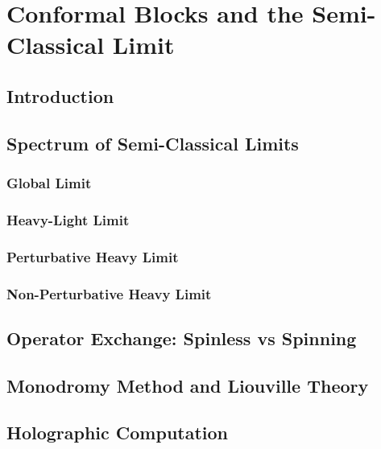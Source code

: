   \chapter{Conformal Blocks and the Semi-Classical Limit}

  \section{Introduction}
  \section{Spectrum of Semi-Classical Limits}
  \subsection{Global Limit}
  \subsection{Heavy-Light Limit}
  \subsection{Perturbative Heavy Limit}
  \subsection{Non-Perturbative Heavy Limit}
  \section{Operator Exchange: Spinless vs Spinning}
  \section{Monodromy Method and Liouville Theory}
  \section{Holographic Computation}